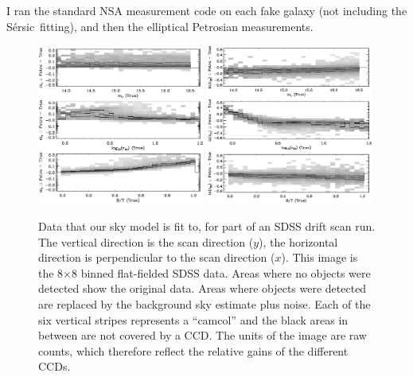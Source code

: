 \documentclass[10pt,preprint]{aastex}
\newcommand{\Sersic}{S\'ersic}
\newcounter{thefigs}
\newcommand{\fignum}{\arabic{thefigs}}
\begin{document}
I ran the standard NSA measurement code on each fake galaxy (not
including the \Sersic\ fitting), and then the elliptical Petrosian
measurements. 

\begin{figure}
\figurenum{\fignum}
\includegraphics[width=0.49\textwidth]{test-simard-petro-flux.ps} \quad
\includegraphics[width=0.49\textwidth]{test-simard-petro-r50.ps} 
\caption{\label{fig:rawrun} Data that our sky model is fit to, for
part of an SDSS drift scan run.  The vertical direction is the scan
direction ($y$), the horizontal direction is perpendicular to the scan
direction ($x$). This image is the 8$\times$8 binned flat-fielded SDSS
data. Areas where no objects were detected show the original data.
Areas where objects were detected are replaced by the background sky
estimate plus noise. Each of the six vertical stripes represents a
``camcol'' and the black areas in between are not covered by a
CCD. The units of the image are raw counts, which therefore reflect
the relative gains of the different CCDs. }
\end{figure}



\end{document}
